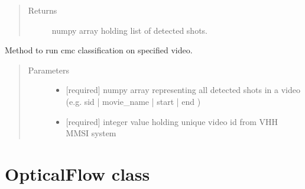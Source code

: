 \documentclass[letterpaper,10pt,english]{sphinxmanual}
\begin{document}
\begin{fulllineitems}
\begin{fulllineitems}
\begin{quote}
\begin{description}
\item[{Returns}] \leavevmode
numpy array holding list of detected shots.

\end{description}\end{quote}

\end{fulllineitems}


\begin{fulllineitems}
\label{\detokenize{CMC:cmc.CMC.CMC.runOnSingleVideo}}
Method to run cmc classification on specified video.
\begin{quote}\begin{description}
\item[{Parameters}] \leavevmode\begin{itemize}
\item {} 
 \textendash{} {[}required{]} numpy array representing all detected shots in a video
(e.g. sid | movie\_name | start | end )

\item {} 
 \textendash{} {[}required{]} integer value holding unique video id from VHH MMSI system

\end{itemize}

\end{description}\end{quote}

\end{fulllineitems}


\end{fulllineitems}



\section{OpticalFlow class}
\label{\detokenize{OpticalFlow:opticalflow-class}}\label{\detokenize{OpticalFlow::doc}}
\end{document}

